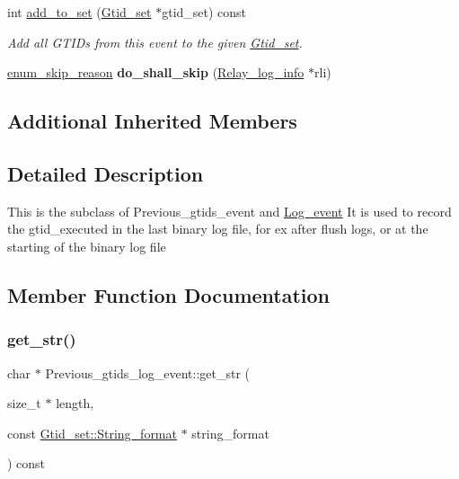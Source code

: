 \begin{DoxyCompactItemize}
int \mbox{\hyperlink{classPrevious__gtids__log__event_a4701bc081dd3a56e13acedfbf07e0fab}{add\+\_\+to\+\_\+set}} (\mbox{\hyperlink{classGtid__set}{Gtid\+\_\+set}} $\ast$gtid\+\_\+set) const
\begin{DoxyCompactList}\small\item\em Add all G\+T\+I\+Ds from this event to the given \mbox{\hyperlink{classGtid__set}{Gtid\+\_\+set}}. \end{DoxyCompactList}\item 
\mbox{\label{classPrevious__gtids__log__event_a463555a9c37b0f268e6c1f4f832f2892}} 
\mbox{\hyperlink{classLog__event_a44955437350a8b9039e32f019dfed40d}{enum\+\_\+skip\+\_\+reason}} {\bfseries do\+\_\+shall\+\_\+skip} (\mbox{\hyperlink{classRelay__log__info}{Relay\+\_\+log\+\_\+info}} $\ast$rli)
\end{DoxyCompactItemize}
\subsection*{Additional Inherited Members}


\subsection{Detailed Description}
This is the subclass of Previous\+\_\+gtids\+\_\+event and \mbox{\hyperlink{classLog__event}{Log\+\_\+event}} It is used to record the gtid\+\_\+executed in the last binary log file, for ex after flush logs, or at the starting of the binary log file 

\subsection{Member Function Documentation}
\mbox{\label{classPrevious__gtids__log__event_a280253bba0731a81c2ae0be0fb5a1181}} 
\subsubsection{\texorpdfstring{get\+\_\+str()}{get\_str()}}
{\footnotesize\ttfamily char $\ast$ Previous\+\_\+gtids\+\_\+log\+\_\+event\+::get\+\_\+str (\begin{DoxyParamCaption}\item[{size\+\_\+t $\ast$}]{length,  }\item[{const \mbox{\hyperlink{structGtid__set_1_1String__format}{Gtid\+\_\+set\+::\+String\+\_\+format}} $\ast$}]{string\+\_\+format }\end{DoxyParamCaption}) const}

